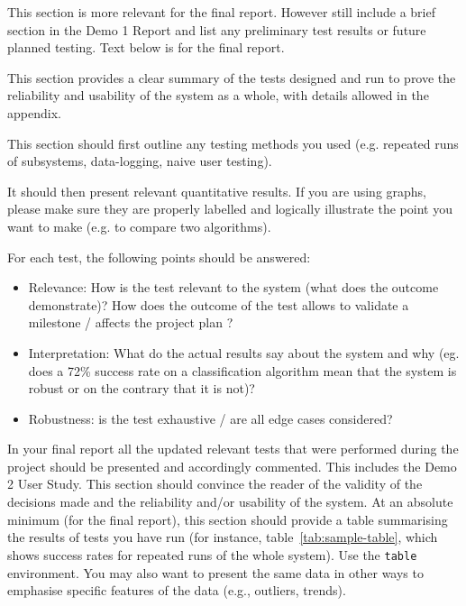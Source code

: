 \documentclass{article}
\begin{document}
{\color{blue}This section is more relevant for the final report. However still include a brief section in the Demo 1 Report and list any preliminary test results or future planned testing. Text below is for the final report.}

This section provides a clear summary of the tests designed and run to prove the reliability and usability of the system as a whole, with details allowed in the appendix.  

This section should first outline any testing methods you used (e.g. repeated runs of subsystems, data-logging, naive user testing). 

It should then present relevant quantitative results. If you are using graphs, please make sure they are properly labelled and logically illustrate the point you want to make (e.g. to compare two algorithms).

For each test, the following points should be answered:

\begin{itemize}
    \item Relevance: How is the test relevant to the system (what does the outcome demonstrate)? How does the outcome of the test allows to validate a milestone / affects the project plan ?
    \item Interpretation: What do the actual results say about the system and why (eg. does a 72\% success rate on a classification algorithm mean that the system is robust or on the contrary that it is not)?
    \item Robustness: is the test exhaustive / are all edge cases considered?
\end{itemize}

In your final report all the updated relevant tests that were performed during the project should be presented and accordingly commented. This includes the Demo 2 User Study. 
This section should convince the reader of the validity of the decisions made and the reliability and/or usability of the system. At an absolute minimum (for the final report), this section should provide a table summarising the  results of tests you have run (for instance, table~\ref{tab:sample-table}, which shows success rates for repeated runs of the whole system). Use the 
\verb+table+ environment. You may also want to present the same data in other ways to emphasise specific features of the data (e.g., outliers, trends).
\end{document}
